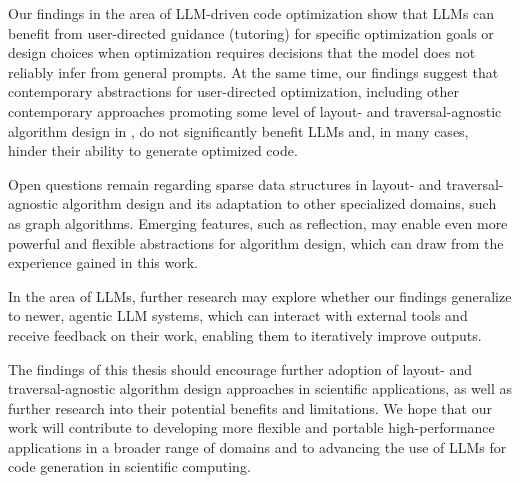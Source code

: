 Our findings in the area of LLM-driven code optimization show that LLMs can benefit from user-directed guidance (tutoring) for specific optimization goals or design choices when optimization requires decisions that the model does not reliably infer from general prompts. At the same time, our findings suggest that contemporary abstractions for user-directed optimization, including other contemporary approaches promoting some level of layout- and traversal-agnostic algorithm design in \cpp, do not significantly benefit LLMs and, in many cases, hinder their ability to generate optimized code.

Open questions remain regarding sparse data structures in layout- and traversal-agnostic algorithm design and its adaptation to other specialized domains, such as graph algorithms. Emerging \cpp features, such as reflection, may enable even more powerful and flexible abstractions for algorithm design, which can draw from the experience gained in this work.

In the area of LLMs, further research may explore whether our findings generalize to newer, agentic LLM systems, which can interact with external tools and receive feedback on their work, enabling them to iteratively improve outputs.

The findings of this thesis should encourage further adoption of layout- and traversal-agnostic algorithm design approaches in scientific applications, as well as further research into their potential benefits and limitations. We hope that our work will contribute to developing more flexible and portable high-performance applications in a broader range of domains and to advancing the use of LLMs for code generation in scientific computing.
